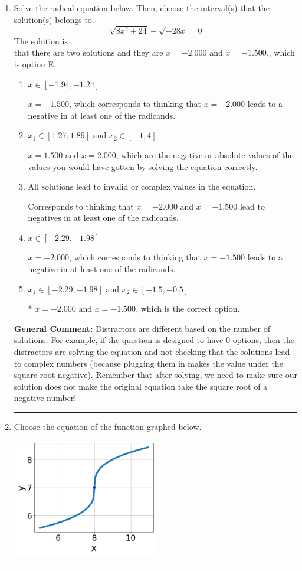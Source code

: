 \documentclass{extbook}[14pt]
\newcommand{\litem}[1]{\item #1

\rule{\textwidth}{0.4pt}}
\begin{document}
\begin{enumerate}\litem{
Solve the radical equation below. Then, choose the interval(s) that the solution(s) belongs to.
\[ \sqrt{8 x^2 + 24} - \sqrt{-28 x} = 0 \]The solution is \( \text{that there are two solutions and they are } x = -2.000 \text{ and } x = -1.500. \), which is option E.\begin{enumerate}[label=\Alph*.]
\item \( x \in [-1.94,-1.24] \)

$x = -1.500$, which corresponds to thinking that $x = -2.000$ leads to a negative in at least one of the radicands.
\item \( x_1 \in [1.27, 1.89] \text{ and } x_2 \in [-1,4] \)

$x = 1.500 \text{ and } x = 2.000$, which are the negative or absolute values of the values you would have gotten by solving the equation correctly.
\item \( \text{All solutions lead to invalid or complex values in the equation.} \)

Corresponds to thinking that $x = -2.000 \text{ and } x = -1.500$ lead to negatives in at least one of the radicands.
\item \( x \in [-2.29,-1.98] \)

$x = -2.000$, which corresponds to thinking that $x = -1.500$ leads to a negative in at least one of the radicands.
\item \( x_1 \in [-2.29, -1.98] \text{ and } x_2 \in [-1.5,-0.5] \)

* $x = -2.000 \text{ and } x = -1.500$, which is the correct option.
\end{enumerate}

\textbf{General Comment:} Distractors are different based on the number of solutions. For example, if the question is designed to have 0 options, then the distractors are solving the equation and not checking that the solutions lead to complex numbers (because plugging them in makes the value under the square root negative). Remember that after solving, we need to make sure our solution does not make the original equation take the square root of a negative number!
}
\litem{
Choose the equation of the function graphed below.

\begin{center}
    \includegraphics[width=0.5\textwidth]{../Figures/radicalGraphToEquationC.png}
\end{center}


}
\end{enumerate}
\end{document}
